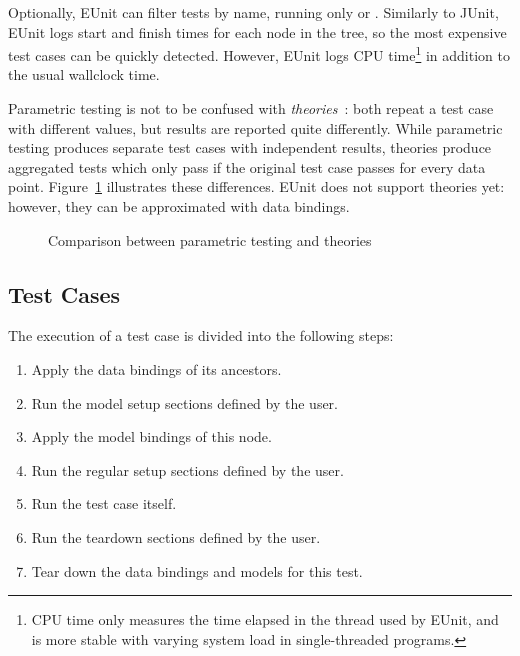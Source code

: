 Optionally, EUnit can filter tests by name, running only  or . Similarly to JUnit, EUnit logs start and finish times for each node in the tree, so the most expensive test cases can be quickly detected. However, EUnit logs CPU time\footnote{CPU time only measures the time elapsed in the thread used by EUnit, and is more stable with varying system load in single-threaded programs.} in addition to the usual wallclock time.

Parametric testing is not to be confused with \emph{theories}~\cite{Saff2007}: both repeat a test case with different values, but results are reported quite differently. While parametric testing produces separate test cases with independent results, theories produce aggregated tests which only pass if the original test case passes for every data point. Figure~\ref{fig:parametric-vs-theories} illustrates these differences. EUnit does not support theories yet: however, they can be approximated with data bindings.

\begin{figure}
  \centering
  \subfigure[Theories]{
    \newcommand{\typea}{test}
    \newcommand{\typeb}{data}
    
  }
  \caption{Comparison between parametric testing and theories}
  \label{fig:parametric-vs-theories}
\end{figure}

\subsection{Test Cases}
\label{sec:eunit-test-cases}

The execution of a test case is divided into the following steps:
\begin{enumerate}
\item Apply the data bindings of its ancestors.
\item Run the model setup sections defined by the user.
\item Apply the model bindings of this node.
\item Run the regular setup sections defined by the user.
\item Run the test case itself.
\item Run the teardown sections defined by the user.
\item Tear down the data bindings and models for this test.
\end{enumerate}

